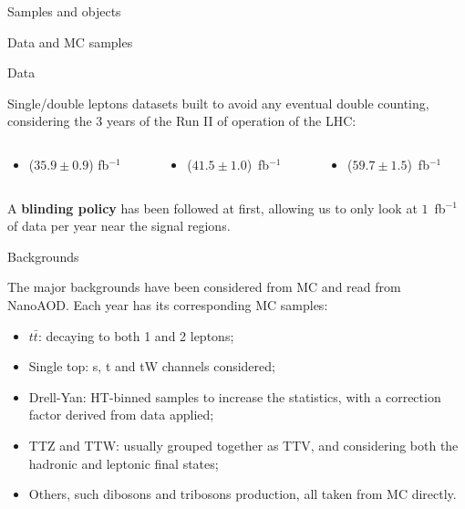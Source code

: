 \documentclass[8pt]{beamer}
\begin{document}
\begin{frame}[standout]
Samples and objects
\end{frame}

\begin{frame}{Data and MC samples}
\justifying
\begin{block}{\centering Data}\end{block}
\alert{Single/double leptons datasets} built to avoid any eventual double counting, considering the 3 years of the Run II of operation of the LHC:
\begin{columns}
\hspace{15pt}
	\begin{column}{0.32\textwidth}
		\begin{itemize}
		\item ($35.9 \pm 0.9$) fb$^{-1}$
		\end{itemize}
	\end{column} \hfill
	\begin{column}{0.32\textwidth}
		\begin{itemize}
		\item ($41.5 \pm 1.0$)~fb$^{-1}$
		\end{itemize}
	\end{column} \hfill
	\begin{column}{0.32\textwidth}
		\begin{itemize}
		\item ($59.7 \pm 1.5$)~fb$^{-1}$
		\end{itemize}
	\end{column} \hfill
\end{columns} \vfill
\vspace{5pt}
A \textbf{blinding policy} has been followed at first, allowing us to only look at $1$~fb$^{-1}$ of data per year near the signal regions. \vfill
\vspace{10pt}
\begin{block}{\centering Backgrounds}\end{block}
The \alert{major backgrounds} have been considered from MC and read from NanoAOD. Each year has its corresponding MC samples:

\begin{itemize}
\justifying
\item $t \bar t$: decaying to both 1 and 2 leptons;%
\item Single top: s, t and tW channels considered;
\item Drell-Yan: HT-binned samples to increase the statistics, with a correction factor derived from data applied;
\item TTZ and TTW: usually grouped together as TTV, and considering both the hadronic and leptonic final states;
\item Others, such dibosons and tribosons production, all taken from MC directly.
\end{itemize} \vfill
\end{frame}
\end{document}

